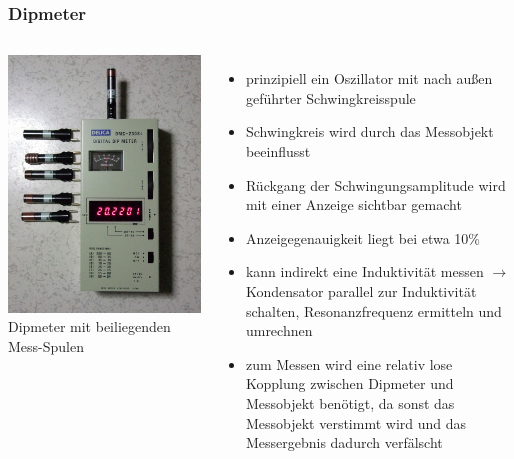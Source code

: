 \begin{frame}
  \frametitle{Dipmeter}
  \begin{columns}
    \begin{center}
      \includegraphics[width=\textwidth,height=.8\textheight,keepaspectratio]{a16/Dipmeter.jpg}\\
      {\tiny Dipmeter mit beiliegenden Mess-Spulen \href{refs}{\cite{wmen}}}
    \end{center}
    \begin{itemize}
      \item prinzipiell ein Oszillator mit nach außen geführter Schwingkreisspule
      \item Schwingkreis wird durch das Messobjekt beeinflusst
      \item Rückgang der Schwingungsamplitude wird mit einer Anzeige sichtbar gemacht
      \item Anzeigegenauigkeit liegt bei etwa 10\%
      \item kann indirekt eine Induktivität messen $\rightarrow$ Kondensator parallel zur Induktivität schalten, Resonanzfrequenz ermitteln und umrechnen
      \item zum Messen wird eine relativ lose Kopplung zwischen Dipmeter und Messobjekt benötigt, da sonst das Messobjekt verstimmt wird und das Messergebnis dadurch verfälscht
    \end{itemize}
  \end{columns}
\end{frame}

